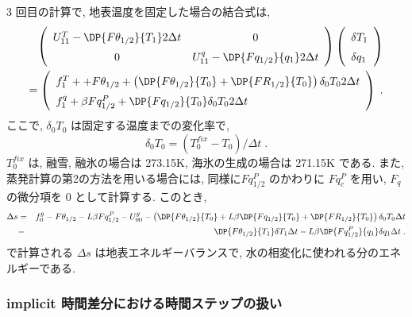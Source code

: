 3 回目の計算で, 地表温度を固定した場合の結合式は, 
\begin{eqnarray}
 \renewcommand{\arraystretch}{1.5}
  \left( \begin{array}{cc}
      U_{11}^T - \DP{F\theta_{1/2}}{T_1} 2 \Delta t &
      0 \\
      0 &
      U_{11}^q - \DP{Fq_{1/2}}{q_1} 2 \Delta t \\
  \end{array} \right)
  \left( \begin{array}{l}
      \delta T_1 \\ \delta q_1 \\
  \end{array} \right) \nonumber \\
=
  \left( \begin{array}{l}
      f_1^T + + F\theta_{1/2}
      + \left( \DP{F\theta_{1/2}}{T_0} 
                    + \DP{FR_{1/2}}{T_0} \right) \delta_0 T_0 2 \Delta t \\
      f_1^q +  \beta Fq^P_{1/2} 
      + \DP{Fq_{1/2}}{T_0} \delta_0 T_0 2 \Delta t \\
  \end{array} \right) \; .
  \label{combin-eq3}
\end{eqnarray}
ここで, $\delta_0 T_0$ は固定する温度までの変化率で, 
\begin{equation}
   \delta_0 T_0 = ( T_0^{fix} - T_0 ) / \Delta t \; .
\end{equation}
$T_0^{fix}$ は, 融雪, 融氷の場合は 273.15K, 
海氷の生成の場合は 271.15K である. 
また, 蒸発計算の第2の方法を用いる場合には,
同様に$Fq^P_{1/2}$ のかわりに $Fq^P_c$ を用い,
$F_q$ の微分項を 0 として計算する.
このとき, 
\begin{eqnarray}
\Delta s & = & f_0^g - F\theta_{1/2} - L \beta Fq^P_{1/2} - U_{00}^g
          -  \left(\DP{F\theta_{1/2}}{T_0}
                + L \beta \DP{Fq_{1/2}}{T_0}
                + \DP{FR_{1/2}}{T_0} \right) \delta_0 T_0 \Delta t 
                \nonumber \\
         & - & \DP{F\theta_{1/2}}{T_1} \delta T_1 \Delta t
                - L \beta \DP{Fq^P_{1/2}}{q_1} \delta q_1 \Delta t \; .
\end{eqnarray}
で計算される $\Delta s$ は地表エネルギーバランスで, 
水の相変化に使われる分のエネルギーである. 

\subsubsection{implicit 時間差分における時間ステップの扱い}


